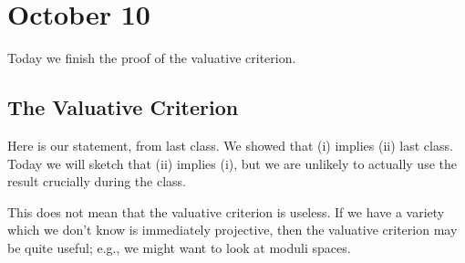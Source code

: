 \documentclass[../notes.tex]{subfiles}
\begin{document}
\section{October 10}

Today we finish the proof of the valuative criterion.

\subsection{The Valuative Criterion}
Here is our statement, from last class.
\valuativecrit*
\noindent We showed that (i) implies (ii) last class. Today we will sketch that (ii) implies (i), but we are unlikely to actually use the result crucially during the class.
\begin{remark}
	This does not mean that the valuative criterion is useless. If we have a variety which we don't know is immediately projective, then the valuative criterion may be quite useful; e.g., we might want to look at moduli spaces.
\end{remark}
\end{document}
